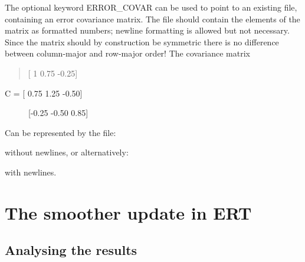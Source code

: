 \documentclass[letterpaper,10pt,english]{sphinxmanual}
\begin{document}
The optional keyword ERROR\_COVAR can be used to point to an existing
file, containing an error covariance matrix. The file should contain
the elements of the matrix as formatted numbers; newline formatting is
allowed but not necessary. Since the matrix should by construction be
symmetric there is no difference between column-major and row-major
order! The covariance matrix
\begin{quote}

{[} 1      0.75  -0.25{]}
\end{quote}
\begin{description}
\item[{C =  {[} 0.75   1.25  -0.50{]}}] \leavevmode
{[}-0.25  -0.50   0.85{]}

\end{description}

Can be represented by the file:

%
\begin{sphinxVerbatim}[commandchars=\\\{\}]
\end{sphinxVerbatim}

without newlines, or alternatively:

%
\begin{sphinxVerbatim}[commandchars=\\\{\}]
         
      
     
\end{sphinxVerbatim}

with newlines.


\chapter{The smoother update in ERT}
\label{\detokenize{update/index:the-smoother-update-in-ert}}\label{\detokenize{update/index::doc}}

\section{Analysing the results}
\label{\detokenize{update/index:analysing-the-results}}
\end{document}

